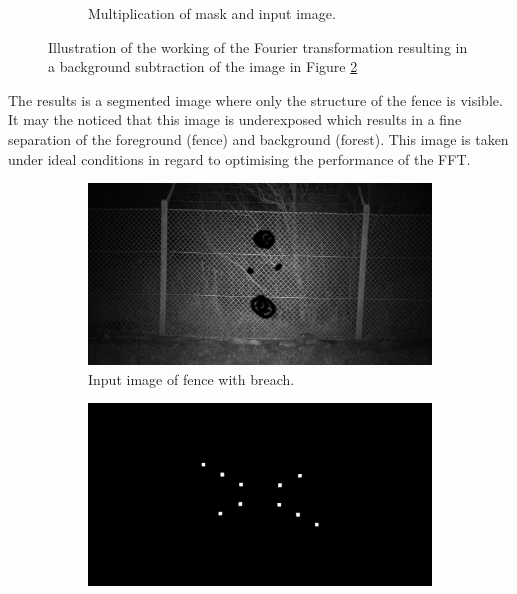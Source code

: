 \documentclass[../Head/Main.tex]{subfiles}
\begin{document}
\begin{figure}[H]
\begin{subfigure}{.48\textwidth}
        \caption{Multiplication of mask and input image.}
        \label{fig:fouier_original_image}
    \end{subfigure}
    \caption{Illustration of the working of the Fourier transformation resulting in a background subtraction of the image in Figure \ref{fig:fouier_original_image}}
\end{figure}
\vspace{-15pt}

The results is a segmented image where only the structure of the fence is visible. It may the noticed that this image is underexposed which results in a fine separation of the foreground (fence) and background (forest). This image is taken under ideal conditions in regard to optimising the performance of the FFT. 

\begin{figure}[H]
    \centering
    \begin{subfigure}{.48\textwidth}
        \centering
        \includegraphics[width=\textwidth]{../Figures/fourier_transformation/fence_breach.png}
        \caption{Input image of fence with breach.}
        \label{fig:input_image_breach}
    \end{subfigure}
    \hfill
    \begin{subfigure}{.48\textwidth}
        \centering
        \includegraphics[width=\textwidth]{../Figures/fourier_transformation/fence_breach_mask.png}

\end{subfigure}
\end{figure}
\end{document}
